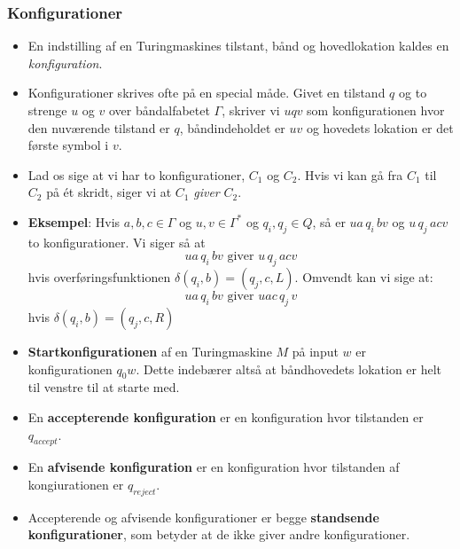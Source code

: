 \begin{frame}[allowframebreaks]
  \frametitle{Konfigurationer}

  \begin{itemize}
    \item En indstilling af en Turingmaskines tilstant, bånd og hovedlokation kaldes en \textit{konfiguration}.
    \item Konfigurationer skrives ofte på en special måde. Givet en tilstand $q$ og to strenge $u$ og $v$ over båndalfabetet $\Gamma$, skriver vi $uqv$ som konfigurationen hvor den nuværende tilstand er $q$, båndindeholdet er $uv$ og hovedets lokation er det første symbol i $v$.
    \item Lad os sige at vi har to konfigurationer, $C_{1}$ og $C_{2}$. Hvis vi kan gå fra $C_{1}$ til $C_{2}$ på ét skridt, siger vi at $C_{1}$ \textit{giver} $C_{2}$.
    \item \textbf{Eksempel}: Hvis $a, b, c \in \Gamma$ og $u, v \in \Gamma^{*}$ og $q_{i}, q_{j} \in Q$, så er $ua\,q_{i}\,bv$ og $u\,q_{j}\,acv$ to konfigurationer. Vi siger så at
          \begin{equation}
ua\,q_{i}\,bv \text{ giver } u\,q_{j}\,acv
          \end{equation}
          hvis overføringsfunktionen $\delta(q_{i},b) = (q_{j}, c, L)$. Omvendt kan vi sige at:
          \begin{equation}
ua\,q_{i}\,bv \text{ giver } uac\,q_{j}\,v
          \end{equation}
          hvis $\delta(q_{i}, b) = (q_{j}, c, R)$
    \item \textbf{Startkonfigurationen} af en Turingmaskine $M$ på input $w$ er konfigurationen $q_{0}w$. Dette indebærer altså at båndhovedets lokation er helt til venstre til at starte med.
    \item En \textbf{accepterende konfiguration} er en konfiguration hvor tilstanden er $q_{accept}$.
    \item En \textbf{afvisende konfiguration} er en konfiguration hvor tilstanden af kongiurationen er $q_{reject}$.
    \item Accepterende og afvisende konfigurationer er begge \textbf{standsende konfigurationer}, som betyder at de ikke giver andre konfigurationer.
  \end{itemize}
\end{frame}

